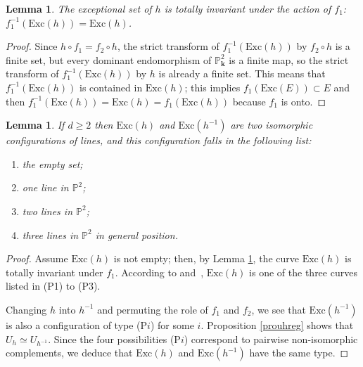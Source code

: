 \documentclass[reqno,oneside,12pt]{amsart}
\theoremstyle{plain}
\newtheorem{lem}[thm]{Lemma}
\theoremstyle{definition}
\def\bfk{{\mathbf{k}}}
\def\P{\mathbb{P}}
\def\Exc{{\text{Exc}}}
\begin{document}
\begin{lem}\label{lemtotinv} The exceptional set of $h$ is totally invariant under the action of $f_1$: $f_1^{-1}(\Exc(h))=\Exc(h)$.
\end{lem}
\begin{proof} Since $h\circ f_1= f_2\circ h$, the strict transform of $f_1^{-1}(\Exc(h))$ by $f_2\circ h$ is a finite set, but every dominant endomorphism of $\P^2_\bfk$ is a finite map, so the strict transform of $f_1^{-1}(\Exc(h))$ by $h$ is already a finite set. This means that $f_1^{-1}(\Exc(h))$ is contained in 
$\Exc(h)$;  this implies $f_1(\Exc(E))\subset E$ and then $f_1^{-1}(\Exc(h))=\Exc(h)=f_1(\Exc(h))$ because $f_1$ is onto.
\end{proof}

\begin{lem}\label{lemconfexc} If $d\geq 2$ then $\Exc(h)$ and $\Exc(h^{-1})$ are two isomorphic configurations of lines, and this
configuration falls in the following list:
\begin{enumerate}
\item[(P0)] the empty set;
\item[(P1)] one line in $\P^2$;
\item[(P2)]  two lines in $\P^2$;
\item[(P3)]  three lines in $\P^2$ in general position.
\end{enumerate}
\end{lem}

\begin{proof} Assume $\Exc(h)$ is not empty; then, by Lemma \ref{lemtotinv},  the curve $\Exc(h)$ is totally invariant under $f_1$.
According to \cite[\S 4]{Fornaess-Sibony} and~\cite[Proposition 2]{Cerveau-LN}, $\Exc(h)$ is one of the three curves listed in (P1) to (P3).


Changing $h$ into $h^{-1}$ and permuting the role of $f_1$ and $f_2$, we see that $\Exc(h^{-1})$ is also a configuration of type (P$i$) for some $i$.
Proposition \ref{prouhreg} shows that $U_h\simeq U_{h^{-1}}$.
Since the four possibilities (P$i$) correspond to pairwise 
non-isomorphic complements, we deduce that $\Exc(h)$ and $\Exc(h^{-1})$ have the same type. 
\end{proof}
\end{document}
